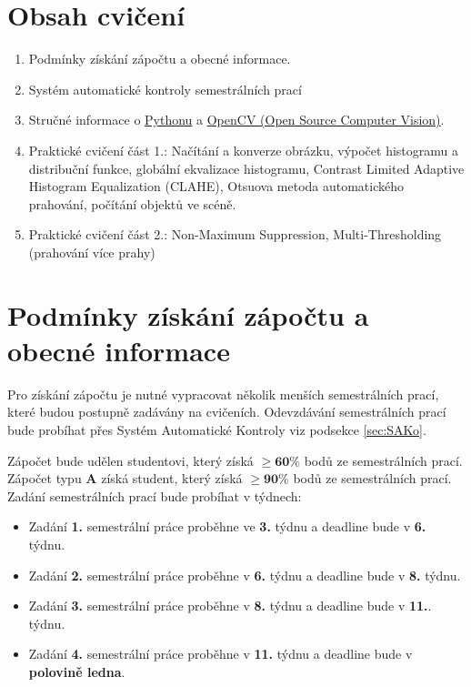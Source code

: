 \documentclass[12pt, a4paper]{article}
\begin{document}
\section*{Obsah cvičení}
\begin{enumerate}
	\item Podmínky získání zápočtu a obecné informace.
	\item Systém automatické kontroly semestrálních prací
	\item Stručné informace o \href{https://www.python.org/}{Pythonu} a \href{http://opencv.org/}{OpenCV (Open Source Computer Vision)}.
	\item Praktické cvičení část 1.: Načítání a konverze obrázku, výpočet histogramu a distribuční funkce, globální ekvalizace histogramu, Contrast Limited Adaptive Histogram Equalization (CLAHE), Otsuova metoda automatického prahování, počítání objektů ve scéně.
	\item Praktické cvičení část 2.: Non-Maximum Suppression, Multi-Thresholding (prahování více prahy)
\end{enumerate}












\section{Podmínky získání zápočtu a obecné informace}
\par{Pro získání zápočtu je nutné vypracovat několik menších semestrálních prací, které budou postupně zadávány na cvičeních. Odevzdávání semestrálních prací bude probíhat přes Systém Automatické Kontroly viz podsekce \ref{sec:SAKo}.}
\par{Zápočet bude udělen studentovi, který získá $\bm{\geq 60\%}$ bodů ze semestrálních prací. Zápočet typu \textbf{A} získá student, který získá $\bm{\geq 90\%}$ bodů ze semestrálních prací. Zadání semestrálních prací bude probíhat v týdnech:
\begin{itemize}
	\item Zadání \textbf{1.} semestrální práce proběhne ve \textbf{3.} týdnu a deadline bude v \textbf{6.} týdnu.
	\item Zadání \textbf{2.} semestrální práce proběhne v \textbf{6.} týdnu a deadline bude v \textbf{8.} týdnu.
	\item Zadání \textbf{3.} semestrální práce proběhne v \textbf{8.} týdnu a deadline bude v \textbf{11.}. týdnu.
	\item Zadání \textbf{4.} semestrální práce proběhne v \textbf{11.} týdnu a deadline bude v \textbf{polovině ledna}.
\end{itemize}}
\end{document}
